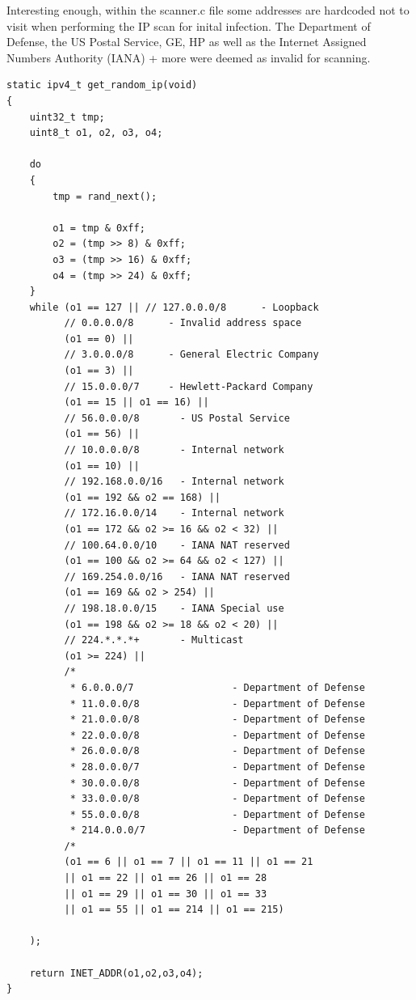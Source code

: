 \documentclass[12pt, letterpaper]{article}
\begin{document}
\begin{sloppypar}
\begin{flushleft}
Interesting enough, within the scanner.c file some addresses are hardcoded not to visit 
when performing the IP scan for inital infection. The Department of Defense, the US Postal
Service, GE, HP as well as the Internet Assigned Numbers Authority (IANA) + more were 
deemed as invalid for scanning.


\begin{verbatim}
static ipv4_t get_random_ip(void)
{
    uint32_t tmp;
    uint8_t o1, o2, o3, o4;

    do
    {
        tmp = rand_next();

        o1 = tmp & 0xff;
        o2 = (tmp >> 8) & 0xff;
        o3 = (tmp >> 16) & 0xff;
        o4 = (tmp >> 24) & 0xff;
    }
    while (o1 == 127 || // 127.0.0.0/8      - Loopback
          // 0.0.0.0/8		- Invalid address space
          (o1 == 0) || 
          // 3.0.0.0/8		- General Electric Company
          (o1 == 3) || 
          // 15.0.0.0/7		- Hewlett-Packard Company
          (o1 == 15 || o1 == 16) || 
          // 56.0.0.0/8       - US Postal Service
          (o1 == 56) || 
          // 10.0.0.0/8       - Internal network
          (o1 == 10) || 
          // 192.168.0.0/16   - Internal network
          (o1 == 192 && o2 == 168) ||
          // 172.16.0.0/14    - Internal network
          (o1 == 172 && o2 >= 16 && o2 < 32) ||
          // 100.64.0.0/10    - IANA NAT reserved
          (o1 == 100 && o2 >= 64 && o2 < 127) ||
          // 169.254.0.0/16   - IANA NAT reserved
          (o1 == 169 && o2 > 254) ||
          // 198.18.0.0/15    - IANA Special use
          (o1 == 198 && o2 >= 18 && o2 < 20) ||
          // 224.*.*.*+       - Multicast
          (o1 >= 224) ||
		  /*
		   * 6.0.0.0/7                 - Department of Defense 
		   * 11.0.0.0/8                - Department of Defense
		   * 21.0.0.0/8                - Department of Defense
		   * 22.0.0.0/8                - Department of Defense
		   * 26.0.0.0/8                - Department of Defense
		   * 28.0.0.0/7                - Department of Defense
		   * 30.0.0.0/8                - Department of Defense
		   * 33.0.0.0/8                - Department of Defense
		   * 55.0.0.0/8                - Department of Defense
		   * 214.0.0.0/7               - Department of Defense
		  /*          
          (o1 == 6 || o1 == 7 || o1 == 11 || o1 == 21 
          || o1 == 22 || o1 == 26 || o1 == 28 
          || o1 == 29 || o1 == 30 || o1 == 33 
          || o1 == 55 || o1 == 214 || o1 == 215) 
          
    );

    return INET_ADDR(o1,o2,o3,o4);
}


\end{verbatim}
\end{flushleft}
\end{sloppypar}
\end{document}
